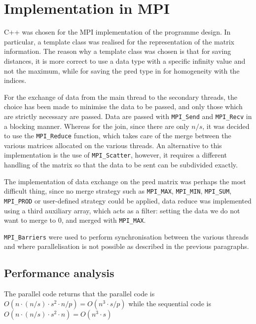 \section{Implementation in MPI}\label{implementation-in-mpi}

C++ was chosen for the MPI implementation of the programme design. In particular, a template class was realised for the representation of the matrix information. The reason why a template class was chosen is that for saving distances, it is more correct to use a data type with a specific infinity value and not the maximum, while for saving the pred type in for homogeneity with the indices.

For the exchange of data from the main thread to the secondary threads, the choice has been made to minimise the data to be passed, and only those which are strictly necessary are passed. Data are passed with \texttt{MPI\_Send} and \texttt{MPI\_Recv} in a blocking manner.
Whereas for the join, since there are only \(n/s\), it was decided to use the \texttt{MPI\_Reduce} function, which takes care of the merge between the various matrices allocated on the various threads. 
An alternative to this implementation is the use of \texttt{MPI\_Scatter}, however, it requires a different handling of the matrix so that the data to be sent can be subdivided exactly.

The implementation of data exchange on the pred matrix was perhaps the most difficult thing, since no merge strategy such as \texttt{MPI\_MAX}, \texttt{MPI\_MIN}, \texttt{MPI\_SUM}, \texttt{MPI\_PROD} or user-defined strategy  could be applied, data reduce was implemented using a third auxiliary array, which acts as a filter: setting the data we do not want to merge to 0, and merged with \texttt{MPI\_MAX}.

\texttt{MPI\_Barriers} were used to perform synchronisation between the various threads and where parallelisation is not possible as described in the previous paragraphs.

\subsection{Performance analysis}

The parallel code returns that the parallel code is \(O(n\cdot (n / s)\cdot s^2\cdot n/p) = O(n^3 \cdot  s /p)\) while the sequential code is \(O(n\cdot (n / s)\cdot s^2\cdot n) =  O(n^3 \cdot  s) \)
\FloatBarrier
